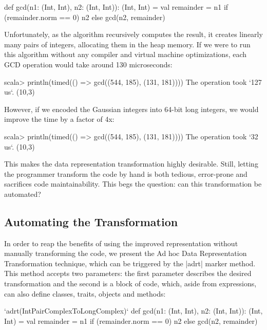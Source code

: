 \begin{lstlisting-nobreak}
def gcd(n1: (Int, Int), n2: (Int, Int)): (Int, Int) = {
  val remainder = n1 %
  if (remainder.norm == 0) n2 else gcd(n2, remainder)
}
\end{lstlisting-nobreak}

Unfortunately, as the algorithm recursively computes the result, it creates linearly many pairs of integers, allocating them in the heap memory. If we were to run this algorithm without any compiler and virtual machine optimizations, each GCD operation would take around 130 microseconds:

\begin{lstlisting-nobreak}
scala>   println(timed(() => gcd((544, 185), (131, 181))))
The operation took `127 us`.
(10,3)
\end{lstlisting-nobreak}

However, if we encoded the Gaussian integers into 64-bit long integers, we would improve the time by a factor of 4x:

\begin{lstlisting-nobreak}
scala> println(timed(() => gcd((544, 185), (131, 181))))
The operation took `32 us`.
(10,3)
\end{lstlisting-nobreak}

This makes the data representation transformation highly desirable. Still, letting the programmer transform the code by hand is both tedious, error-prone and sacrifices code maintainability. This begs the question: can this transformation be automated?

\subsection{Automating the Transformation}

In order to reap the benefits of using the improved representation without manually transforming the code, we present the Ad hoc Data Representation Transformation technique, which can be triggered by the |adrt| marker method. This method accepts two parameters: the first parameter describes the desired transformation and the second is a block of code, which, aside from expressions, can also define classes, traits, objects and methods:

\begin{lstlisting-nobreak}
`adrt(IntPairComplexToLongComplex)` {
  def gcd(n1: (Int, Int), n2: (Int, Int)): (Int, Int) = {
    val remainder = n1 %
    if (remainder.norm == 0) n2 else gcd(n2, remainder)
  }
}
\end{lstlisting-nobreak}

